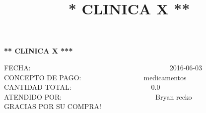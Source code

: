 \documentclass[10pt,a4paper]{letter}
\title{\bf ** CLINICA X **}
\begin{document}
\begin{center}
{\scshape\LARGE \bf *** CLINICA X ***\par}

\end{center}

FECHA:\ \ \ \ \ \ \ \ \ \ \ \ \ \ \ \ \ \ \ \ \ \ \ \ \ \ \ \ \ \ \ \ \ \ \ \ \ \ \ \ 2016-06-03 \\
CONCEPTO DE PAGO:\ \ \ \ \ \ \ \ \ \ \ \ \ \ \ \ \ \ medicamentos \\
CANTIDAD TOTAL:\ \ \ \ \ \ \ \ \ \ \ \ \ \ \ \ \ \ \ \ \ \ \ 0.0 \\
ATENDIDO POR:\ \ \ \ \ \ \ \ \ \ \ \ \ \ \ \ \ \ \ \ \ \ \ \ \ \ \ Bryan recko \\
GRACIAS POR SU COMPRA! \\ \\

 
\end{document}
